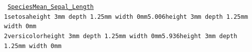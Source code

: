 \documentclass[
]{book}
\begin{document}
\texttt{
\underline{\hspace*{0.52em}\hspace*{0.52em}\hspace*{0.52em}\hspace*{0.52em}\hspace*{0.52em}\hspace*{0.52em}\hspace*{0.52em}Species\hspace*{0.52em}Mean\_Sepal\_Length}\\
1\hspace*{0.52em}\hspace*{0.52em}\textcolor[HTML]{FFFFFF}{\colorbox[HTML]{A020F0}{\hspace*{0.52em}\hspace*{0.52em}\hspace*{0.52em}\hspace*{0.52em}\hspace*{0.52em}setosa\vrule height 3mm depth 1.25mm width 0mm}}\textcolor[HTML]{FFFFFF}{\colorbox[HTML]{A020F0}{\hspace*{0.52em}\hspace*{0.52em}\hspace*{0.52em}\hspace*{0.52em}\hspace*{0.52em}\hspace*{0.52em}\hspace*{0.52em}\hspace*{0.52em}\hspace*{0.52em}\hspace*{0.52em}\hspace*{0.52em}\hspace*{0.52em}\hspace*{0.52em}5.006\vrule height 3mm depth 1.25mm width 0mm}}\\
2\hspace*{0.52em}\hspace*{0.52em}\textcolor[HTML]{000000}{\colorbox[HTML]{EE82EE}{\hspace*{0.52em}versicolor\vrule height 3mm depth 1.25mm width 0mm}}\textcolor[HTML]{000000}{\colorbox[HTML]{EE82EE}{\hspace*{0.52em}\hspace*{0.52em}\hspace*{0.52em}\hspace*{0.52em}\hspace*{0.52em}\hspace*{0.52em}\hspace*{0.52em}\hspace*{0.52em}\hspace*{0.52em}\hspace*{0.52em}\hspace*{0.52em}\hspace*{0.52em}\hspace*{0.52em}5.936\vrule height 3mm depth 1.25mm width 0mm}}\\
}
\end{document}
